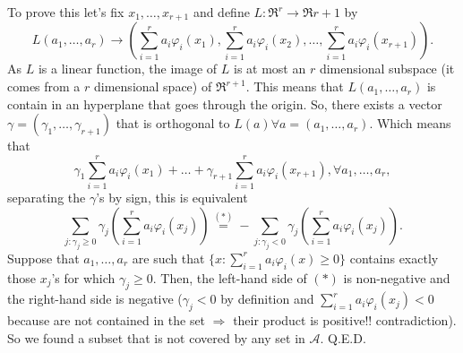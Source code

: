 \documentclass[11pt, english]{article}
\newcommand{\su}[2]{\sum\limits_{#1}^{#2}}
\begin{document}
To prove this let's fix $x_1,\dots,x_{r+1}$ and define $L:\Re^r\rightarrow\Re{r+1}$ by 
\begin{equation}
L(a_1,\dots,a_r)\rightarrow(\su{i=1}{r}a_i\varphi_i(x_1),\su{i=1}{r}a_i\varphi_i(x_2),\dots,\su{i=1}{r}a_i\varphi_i(x_{r+1})).
\end{equation}
As $L$ is a linear function, the image of $L$ is at most an $r$ dimensional subspace (it comes from a $r$ dimensional space) of $\Re^{r+1}$. This means that $L(a_1,\dots,a_r)$ is contain in an hyperplane that goes through the origin. So, there exists a vector $\gamma=(\gamma_1,\dots,\gamma_{r+1})$ that is orthogonal to $L(a)\forall a=(a_1,\dots,a_r)$. Which means that
\begin{equation}
	\gamma_1\su{i=1}{r}a_i\varphi_i(x_1)+\dots+\gamma_{r+1}\su{i=1}{r}a_i\varphi_i(x_{r+1}),\forall a_1,\dots,a_r,
\end{equation}
separating the $\gamma$'s by sign, this is equivalent 
\begin{equation}
	\su{j:\gamma_j\geq 0}{}\gamma_j(\su{i=1}{r}a_i\varphi_i(x_j))\overset{(*)}{=}-\su{j:\gamma_j<0}{}\gamma_j(\su{i=1}{r}a_i\varphi_i(x_j)).
\end{equation}
Suppose that $a_1,\dots,a_r$ are such that $\{x:\su{i=1}{r}a_i\varphi_i(x)\geq0\}$ contains exactly those $x_j$'s for which $\gamma_j\geq 0$. Then, the left-hand side of $(*)$ is non-negative and the right-hand side is negative ($\gamma_j<0$ by definition and $\su{i=1}{r}a_i\varphi_i(x_j)<0$ because are not contained in the set $\Rightarrow$ their product is positive!! contradiction). So we found a subset that is not covered by any set in $\mathcal{A}$. Q.E.D.\\
\end{document}
